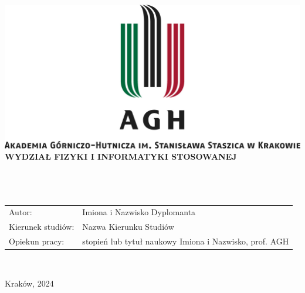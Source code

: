 \documentclass[11pt,a4paper]{report}
\begin{document}
\thispagestyle{empty}
\begin{center}
\includegraphics[width=\textwidth]{logo_AGH.jpg}\\
{\bf{\sf WYDZIAŁ FIZYKI I INFORMATYKI STOSOWANEJ}}\\[5mm]
{\bf{}}\\[14mm]
{}\\[12mm] 
{}\\[40mm]
\end{center}
{\sf
\begin{tabular}{ll}
Autor: & Imiona i Nazwisko Dyplomanta\\
Kierunek studiów: &	Nazwa Kierunku Studiów\\
Opiekun pracy: & stopień lub tytuł naukowy Imiona i Nazwisko, prof. AGH\\
\end{tabular}
}\\[10mm]
\begin{center}
{\sf Kraków, 2024}
\end{center}

\newpage
\end{document}

